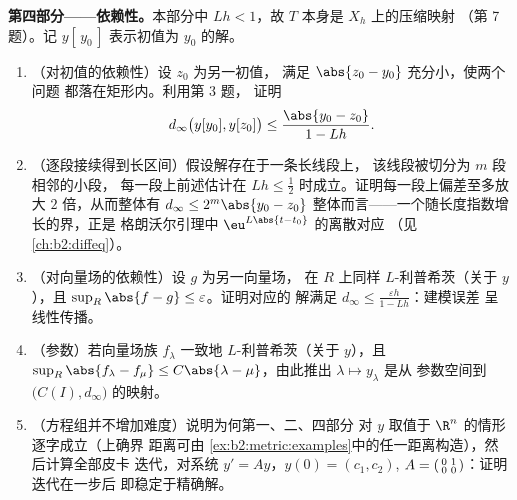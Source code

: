 \begin{problem}
\medskip
\noindent\textbf{第四部分——依赖性。}本部分中
        $Lh < 1$，故 $T$ 本身是 $X_h$ 上的压缩映射
        （第 7 题）。记 $y[\,y_0\,]$ 表示初值为
        $y_0$ 的解。
\begin{enumerate}[resume]
  \item （对初值的依赖性）设 $z_0$ 为另一初值，
        满足 $\abs{z_0 - y_0}$ 充分小，使两个问题
        都落在矩形内。利用第 3 题，
        证明
        \[
        d_\infty\bigl(y[y_0], y[z_0]\bigr) \leq
        \frac{\abs{y_0 - z_0}}{1 - Lh}.
        \]
  \item （逐段接续得到长区间）假设解存在于一条长线段上，
        该线段被切分为 $m$ 段相邻的小段，
        每一段上前述估计在 $Lh \leq
        \frac12$ 时成立。证明每一段上偏差至多放大
        $2$ 倍，从而整体有 $d_\infty \leq 2^m\abs{y_0 - z_0}$
        整体而言——一个随长度指数增长的界，正是
        格朗沃尔引理中 $\eu^{L\abs{t - t_0}}$ 的离散对应
        （见\cref{ch:b2:diffeq}）。
  \item （对向量场的依赖性）设 $g$ 为另一向量场，
        在 $R$ 上同样 $L$-利普希茨（关于 $y$），且 $\sup_R \abs{f - g}
        \leq \varepsilon$。证明对应的
        解满足 $d_\infty \leq
        \frac{\varepsilon h}{1 - Lh}$：建模误差
        呈线性传播。
  \item （参数）若向量场族 $f_\lambda$
        一致地 $L$-利普希茨（关于 $y$），且 $\sup_R\abs{f_\lambda
        - f_\mu} \leq C\abs{\lambda - \mu}$，由此推出
        $\lambda \mapsto y_\lambda$ 是从
        参数空间到 $\bigl(C(I), d_\infty\bigr)$ 的映射。
  \item （方程组并不增加难度）说明为何第一、二、四部分
        对 $y$ 取值于 $\R^n$ 的情形逐字成立（上确界
        距离可由
        \cref{ex:b2:metric:examples}中的任一距离构造），然后计算全部皮卡
        迭代，对系统 $y' = Ay$，$y(0) = (c_1,
        c_2)$, $A = \begin{psmallmatrix} 0 & 1\\ 0 &
        0\end{psmallmatrix}$：证明迭代在一步后
        即稳定于精确解。
\end{enumerate}


\end{problem}
